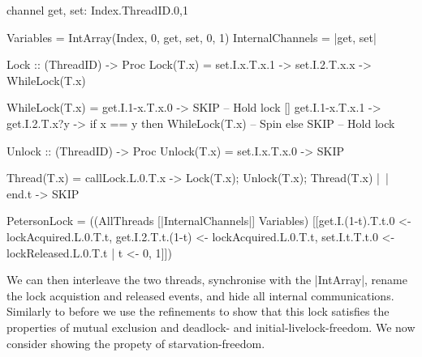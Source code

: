 \begin{cspm}[caption={The CSP implementation of the Peterson Lock}]
channel get, set: Index.ThreadID.{0,1}

Variables = IntArray(Index, 0, get, set, 0, 1)
InternalChannels = {|get, set|}

Lock :: (ThreadID) -> Proc
Lock(T.x) =  set.I.x.T.x.1 -> set.I.2.T.x.x -> WhileLock(T.x)

WhileLock(T.x) = 
     get.I.1-x.T.x.0 -> SKIP -- Hold lock
   [] get.I.1-x.T.x.1 ->  get.I.2.T.x?y ->
                         if x == y then WhileLock(T.x) -- Spin
                         else SKIP -- Hold lock

Unlock :: (ThreadID) -> Proc
Unlock(T.x) = set.I.x.T.x.0 -> SKIP

Thread(T.x) =     callLock.L.0.T.x -> Lock(T.x); Unlock(T.x); Thread(T.x)
              |~| end.t -> SKIP

PetersonLock = ((AllThreads [|InternalChannels|] Variables)
                  [[get.I.(1-t).T.t.0 <- lockAcquired.L.0.T.t,
                  get.I.2.T.t.(1-t) <- lockAcquired.L.0.T.t,
                  set.I.t.T.t.0 <- lockReleased.L.0.T.t | t <- {0, 1}]])
\end{cspm}

We can then interleave the two threads, synchronise with the |IntArray|, rename the lock acquistion and released events, and hide all internal communications. Similarly to before we use the refinements to show that this lock satisfies the properties of mutual exclusion and deadlock- and initial-livelock-freedom. We now consider showing the propety of starvation-freedom.




